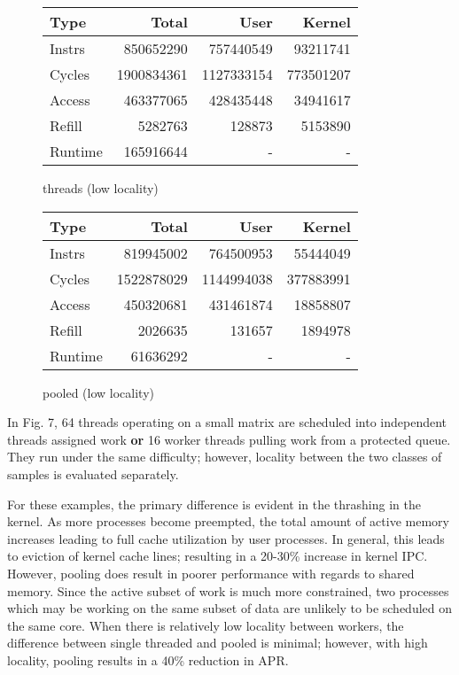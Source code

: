 \documentclass[11pt]{article}
\begin{document}
\begin{figure*}[!h]
	\begin{subtable}{.48\textwidth} 
		\centering
		\begin{tabular}{ l|rrr }
			Type    & Total      & User       & Kernel    \\
			\hline
			Instrs & 850652290 & 757440549 & 93211741 \\ 
			Cycles & 1900834361 & 1127333154 & 773501207 \\ 
			Access & 463377065 & 428435448 & 34941617 \\ 
			Refill & 5282763 & 128873 & 5153890 \\ 
			Runtime & 165916644 & - & - \\
			\hline
		\end{tabular}
		\caption{threads (low locality)}
	\end{subtable}
	\hfill
	\begin{subtable}{.48\textwidth} 
		\centering
		\begin{tabular}{ l|rrr }
			Type    & Total      & User       & Kernel    \\
			\hline
			Instrs & 819945002 & 764500953 & 55444049 \\ 
			Cycles & 1522878029 & 1144994038 & 377883991 \\ 
			Access & 450320681 & 431461874 & 18858807 \\ 
			Refill & 2026635 & 131657 & 1894978 \\ 
			Runtime & 61636292 & - & - \\
			\hline
		\end{tabular}
		\caption{pooled (low locality)}
	\end{subtable}
\end{figure*}

In Fig. 7, 64 threads operating on a small matrix are scheduled into independent threads assigned work \textbf{or} 16 worker threads pulling work from a protected queue.  They run under the same difficulty; however, locality between the two classes of samples is evaluated separately.

For these examples, the primary difference is evident in the thrashing in the kernel.  As more processes become preempted, the total amount of active memory increases leading to full cache utilization by user processes.  In general, this leads to eviction of kernel cache lines; resulting in a 20-30\% increase in kernel IPC.  However, pooling does result in poorer performance with regards to shared memory.  Since the active subset of work is much more constrained, two processes which may be working on the same subset of data are unlikely to be scheduled on the same core.  When there is relatively low locality between workers, the difference between single threaded and pooled is minimal; however, with high locality, pooling results in a 40\% reduction in APR.
\end{document}
